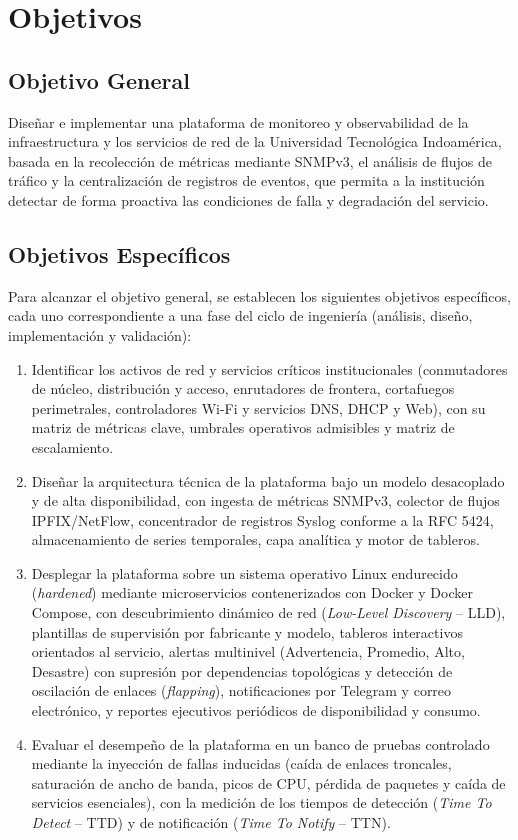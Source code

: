 \section{Objetivos}
\label{sec:objetivos}

\subsection{Objetivo General}
Diseñar e implementar una plataforma de monitoreo y observabilidad de la infraestructura y los servicios de red de la Universidad Tecnológica Indoamérica, basada en la recolección de métricas mediante SNMPv3, el análisis de flujos de tráfico y la centralización de registros de eventos, que permita a la institución detectar de forma proactiva las condiciones de falla y degradación del servicio.

\subsection{Objetivos Específicos}
Para alcanzar el objetivo general, se establecen los siguientes objetivos específicos, cada uno correspondiente a una fase del ciclo de ingeniería (análisis, diseño, implementación y validación):

\begin{enumerate}
  \item Identificar los activos de red y servicios críticos institucionales (conmutadores de núcleo, distribución y acceso, enrutadores de frontera, cortafuegos perimetrales, controladores Wi-Fi y servicios DNS, DHCP y Web), con su matriz de métricas clave, umbrales operativos admisibles y matriz de escalamiento.
  \item Diseñar la arquitectura técnica de la plataforma bajo un modelo desacoplado y de alta disponibilidad, con ingesta de métricas SNMPv3, colector de flujos IPFIX/NetFlow, concentrador de registros Syslog conforme a la RFC 5424, almacenamiento de series temporales, capa analítica y motor de tableros.
  \item Desplegar la plataforma sobre un sistema operativo Linux endurecido (\textit{hardened}) mediante microservicios contenerizados con Docker y Docker Compose, con descubrimiento dinámico de red (\textit{Low-Level Discovery} -- LLD), plantillas de supervisión por fabricante y modelo, tableros interactivos orientados al servicio, alertas multinivel (Advertencia, Promedio, Alto, Desastre) con supresión por dependencias topológicas y detección de oscilación de enlaces (\textit{flapping}), notificaciones por Telegram y correo electrónico, y reportes ejecutivos periódicos de disponibilidad y consumo.
  \item Evaluar el desempeño de la plataforma en un banco de pruebas controlado mediante la inyección de fallas inducidas (caída de enlaces troncales, saturación de ancho de banda, picos de CPU, pérdida de paquetes y caída de servicios esenciales), con la medición de los tiempos de detección (\textit{Time To Detect} -- TTD) y de notificación (\textit{Time To Notify} -- TTN).
\end{enumerate}

